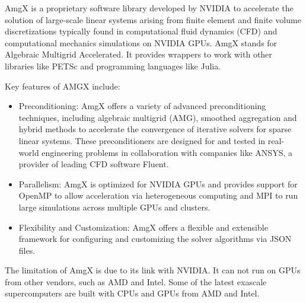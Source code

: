 
AmgX is a proprietary software library developed by NVIDIA to accelerate the solution of large-scale linear systems arising from finite element and finite volume discretizations typically found in computational fluid dynamics (CFD) and computational mechanics simulations on NVIDIA GPUs.
AmgX stands for Algebraic Multigrid Accelerated.
It provides wrappers to work with other libraries like PETSc and programming languages like Julia.

Key features of AMGX include:
\begin{itemize}
    \item Preconditioning: AmgX offers a variety of advanced preconditioning techniques, including algebraic multigrid (AMG), smoothed aggregation and hybrid methods to accelerate the convergence of iterative solvers for sparse linear systems.
    These preconditioners are designed for and tested in real-world engineering problems in collaboration with companies like ANSYS, a provider of leading CFD software Fluent.
    \item Parallelism: AmgX is optimized for NVIDIA GPUs and provides support for OpenMP to allow acceleration via heterogeneous computing and MPI to run large simulations across multiple GPUs and clusters.
    \item Flexibility and Customization: AmgX offers a flexible and extensible framework for configuring and customizing the solver algorithms via JSON files. 
\end{itemize}
The limitation of AmgX is due to its link with NVIDIA. It can not run on GPUs from other vendors, such as AMD and Intel. Some of the latest exascale supercomputers are built with CPUs and GPUs from AMD and Intel.
